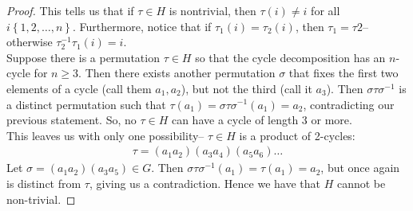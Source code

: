 \documentclass{memoir}
\begin{document}
\begin{proof}
	This tells us that if \(\tau \in H \)  is nontrivial, then \(\tau (i) \neq i\) for all \(i \left\{ 1,2,\ldots,n \right\} \). Furthermore, notice that if \(\tau_1(i) = \tau_2(i)\), then \(\tau_1=\tau 2\)-- otherwise \(\tau_2^{-1}\tau_1(i) = i\).\\

	Suppose there is a permutation \(\tau  \in H\) so that the cycle decomposition has an \(n\)-cycle for \(n\geq 3\). Then there exists another permutation \(\sigma \) that fixes the first two elements of a cycle (call them \(a_1,a_2\)), but not the third (call it \(a_3\)). Then \(\sigma \tau \sigma^{-1}\) is a distinct permutation such that \(\tau(a_1) = \sigma \tau \sigma^{-1}(a_1) = a_2\), contradicting our previous statement. So, no \(\tau  \in H\) can have a cycle of length 3 or more.\\

	This leaves us with only one possibility-- \( \tau  \in H\) is a product of 2-cycles:
	\begin{align*}
		\tau = (a_1a_2)(a_3a_4)(a_5a_6)\ldots
	\end{align*}
	Let \(\sigma = (a_1a_2)(a_3a_5) \in G\). Then \(\sigma \tau \sigma^{-1}(a_1) = \tau (a_1) = a_2\), but once again is distinct from \(\tau\), giving us a contradiction. Hence we have that \(H\) cannot be non-trivial.
\end{proof}

\end{document}
